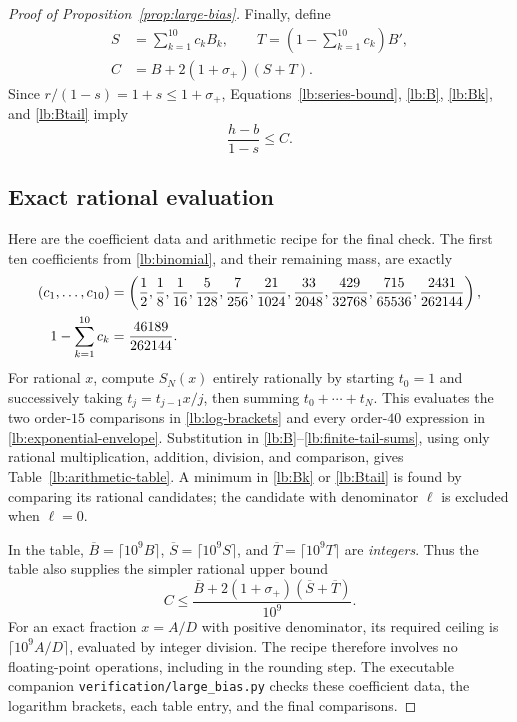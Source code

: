 \begin{proof}[Proof of Proposition~\ref{prop:large-bias}]
Finally, define
\begin{equation}\label{lb:finite-tail-sums}
 \begin{split}
 S&=\sum_{k=1}^{10}c_k B_k,\qquad
 T=\left(1-\sum_{k=1}^{10}c_k\right)B',\\
 C&=B+2(1+\sigma_+)(S+T).
 \end{split}
\end{equation}
Since $r/(1-s)=1+s\le1+\sigma_+$, Equations~\eqref{lb:series-bound},
\eqref{lb:B}, \eqref{lb:Bk}, and \eqref{lb:Btail} imply
\begin{equation}\label{lb:final-reduction}
 \frac{h-b}{1-s}\le C.
\end{equation}

\subsection{Exact rational evaluation}

Here are the coefficient data and arithmetic recipe for the final check.
The first ten coefficients from \eqref{lb:binomial}, and their remaining
mass, are exactly
\begin{align}
 (c_1,\ldots,c_{10})
 &=\left(\frac12,\frac18,\frac1{16},\frac5{128},\frac7{256},
 \frac{21}{1024},\frac{33}{2048},\frac{429}{32768},
 \frac{715}{65536},\frac{2431}{262144}\right),\notag\\
 1-\sum_{k=1}^{10}c_k&=\frac{46189}{262144}.
 \label{lb:coefficient-data}
\end{align}
For rational $x$, compute $S_N(x)$ entirely rationally by starting
$t_0=1$ and successively taking $t_j=t_{j-1}x/j$, then summing
$t_0+\cdots+t_N$. This evaluates the two order-$15$ comparisons in
\eqref{lb:log-brackets} and every order-$40$ expression in
\eqref{lb:exponential-envelope}. Substitution in
\eqref{lb:B}--\eqref{lb:finite-tail-sums}, using only rational
multiplication, addition, division, and comparison, gives
Table~\ref{lb:arithmetic-table}. A minimum in \eqref{lb:Bk} or
\eqref{lb:Btail} is found by comparing its rational candidates; the
candidate with denominator $\ell$ is excluded when $\ell=0$.

In the table, $\overline B=\lceil10^9 B\rceil$,
$\overline S=\lceil10^9 S\rceil$, and
$\overline T=\lceil10^9 T\rceil$ are \emph{integers}.
Thus the table also supplies the simpler rational upper bound
\begin{equation}\label{lb:rounded-total}
 C\le\frac{\overline B+
                2(1+\sigma_+)(\overline S+\overline T)}{10^9}.
\end{equation}
For an exact fraction $x=A/D$ with positive denominator, its required
ceiling is $\lceil10^9A/D\rceil$, evaluated by integer division.
The recipe therefore involves no floating-point operations, including
in the rounding step. The executable companion
\texttt{verification/large\_bias.py} checks these coefficient data,
the logarithm brackets, each table entry, and the final comparisons.


\end{proof}
